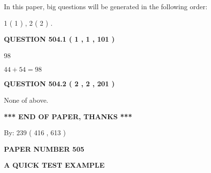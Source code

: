 \documentclass[12pt]{article}
\begin{document}
In this paper, big questions will be generated in the following order: 
   
   
   1 ( 1 )
 ,
   2 ( 2 )
 .
  
\vspace{0.2in}
  
{\textbf{\Large{QUESTION
504.1 
 ( 1 , 1 , 101 )
}}}
  
  
 
 
\noindent{}

98
 
 
 
 
\noindent{}

$ %
44 +  %
54=   %
98$
 
 
  
\vspace{0.2in}
  
{\textbf{\Large{QUESTION
504.2 
 ( 2 , 2 , 201 )
}}}
  
  
 
 
\noindent{}
 
 
 None of above.
 
 
 
 
   
   
 \vspace{0.2in}
 
   
   
   
   
\vspace{1.0in} 
{\textbf{\large{ *** END OF PAPER, THANKS *** }}} 
   
   
\hspace{1.0in} By: 
 239 ( 416 ,  613 )
   
   
   
   
\newpage 
\setcounter{page}{ 
   505001 } 
   
   
   
   
 {\textbf{ \Large{ PAPER NUMBER  505  }}}
   
   
\vspace{0.2in}
   
   
   
   
   
   
 \vspace{0.2in}
{\LARGE {\textbf{ A QUICK TEST EXAMPLE}}}
   
\end{document}
